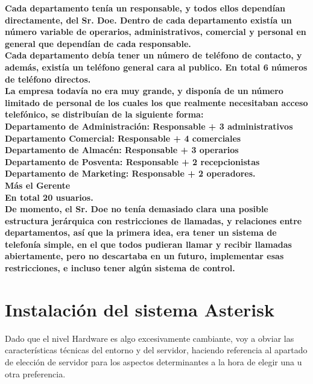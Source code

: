 \textbf{Cada departamento tenía un responsable, y todos ellos dependían directamente, del Sr. Doe. Dentro de cada departamento existía un número variable de operarios, administrativos, comercial y personal en general que dependían de cada responsable.}\\

\textbf{Cada departamento debía tener un número de teléfono de contacto, y además, existía un teléfono general cara al publico. En total 6 números de teléfono directos.}\\

\textbf{La empresa todavía no era muy grande, y disponía de un número limitado de personal de los cuales los que realmente necesitaban acceso telefónico, se distribuían de la siguiente forma:}\\

\textbf{Departamento de Administración: Responsable + 3 administrativos}\\
\textbf{Departamento Comercial: Responsable + 4 comerciales}\\
\textbf{Departamento de Almacén: Responsable + 3 operarios}\\
\textbf{Departamento de Posventa: Responsable + 2 recepcionistas}\\
\textbf{Departamento de Marketing: Responsable + 2 operadores.} \\
\textbf{Más el Gerente}\\

\textbf{En total 20 usuarios.}\\

\textbf{De momento, el Sr. Doe no tenía demasiado clara una posible estructura jerárquica con restricciones de llamadas, y relaciones entre departamentos, así que la primera idea, era tener un sistema de telefonía simple, en el que todos pudieran llamar y recibir llamadas abiertamente, pero no descartaba en un futuro, implementar esas restricciones, e incluso tener algún sistema de control.}

\section{Instalación del sistema Asterisk}

Dado que el nivel Hardware es algo excesivamente cambiante, voy a obviar las características técnicas del entorno y del servidor, haciendo referencia al apartado de elección de servidor para los aspectos determinantes a la hora de elegir una u otra preferencia.\\

